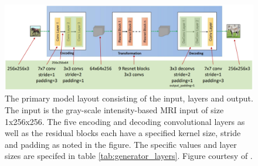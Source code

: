 \documentclass[11pt, fleqn, titlepage]{article}
\newcommand{\1}[1]{\mathds{1}\left[#1\right]}
\begin{document}
\begin{figure}[H]
	\centering
	\includegraphics[width=0.7\linewidth]{imgs/cyclegan_generator_layers}
	\caption{The primary model layout consisting of the input, layers and output. The input is the gray-scale intensity-based MRI input of size 1x256x256. The five encoding and decoding convolutional layers as well as the residual blocks each have a specified kernel size, stride and padding as noted in the figure. The specific values and layer sizes are specifed in table \ref{tab:generator_layers}. Figure courtesy of \cite{cyclegan_figures}.}
	\label{fig:cyclegangeneratorlayers}
\end{figure}
\end{document}
